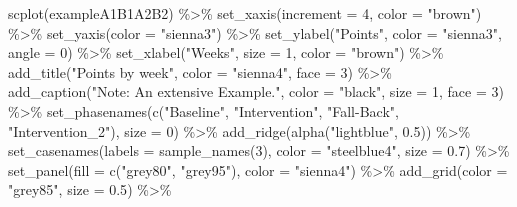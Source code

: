 \documentclass[
  letterpaper,
  DIV=11,
  numbers=noendperiod]{scrreprt}
\newenvironment{Shaded}{\begin{snugshade}}{\end{snugshade}}
\newcommand{\AttributeTok}[1]{\textcolor[rgb]{0.40,0.45,0.13}{#1}}
\newcommand{\DecValTok}[1]{\textcolor[rgb]{0.68,0.00,0.00}{#1}}
\newcommand{\FloatTok}[1]{\textcolor[rgb]{0.68,0.00,0.00}{#1}}
\newcommand{\FunctionTok}[1]{\textcolor[rgb]{0.28,0.35,0.67}{#1}}
\newcommand{\NormalTok}[1]{\textcolor[rgb]{0.00,0.23,0.31}{#1}}
\newcommand{\SpecialCharTok}[1]{\textcolor[rgb]{0.37,0.37,0.37}{#1}}
\newcommand{\StringTok}[1]{\textcolor[rgb]{0.13,0.47,0.30}{#1}}
\begin{document}
\begin{Shaded}
\begin{Highlighting}[]
\FunctionTok{scplot}\NormalTok{(exampleA1B1A2B2) }\SpecialCharTok{\%\textgreater{}\%} 
  \FunctionTok{set\_xaxis}\NormalTok{(}\AttributeTok{increment =} \DecValTok{4}\NormalTok{, }\AttributeTok{color =} \StringTok{"brown"}\NormalTok{) }\SpecialCharTok{\%\textgreater{}\%}
  \FunctionTok{set\_yaxis}\NormalTok{(}\AttributeTok{color =} \StringTok{"sienna3"}\NormalTok{) }\SpecialCharTok{\%\textgreater{}\%}
  \FunctionTok{set\_ylabel}\NormalTok{(}\StringTok{"Points"}\NormalTok{, }\AttributeTok{color =} \StringTok{"sienna3"}\NormalTok{, }\AttributeTok{angle =} \DecValTok{0}\NormalTok{) }\SpecialCharTok{\%\textgreater{}\%}
  \FunctionTok{set\_xlabel}\NormalTok{(}\StringTok{"Weeks"}\NormalTok{, }\AttributeTok{size =} \DecValTok{1}\NormalTok{, }\AttributeTok{color =} \StringTok{"brown"}\NormalTok{) }\SpecialCharTok{\%\textgreater{}\%}
  \FunctionTok{add\_title}\NormalTok{(}\StringTok{"Points by week"}\NormalTok{, }\AttributeTok{color =} \StringTok{"sienna4"}\NormalTok{, }\AttributeTok{face =} \DecValTok{3}\NormalTok{) }\SpecialCharTok{\%\textgreater{}\%}
  \FunctionTok{add\_caption}\NormalTok{(}\StringTok{"Note: An extensive Example."}\NormalTok{,}
              \AttributeTok{color =} \StringTok{"black"}\NormalTok{, }\AttributeTok{size =} \DecValTok{1}\NormalTok{, }\AttributeTok{face =} \DecValTok{3}\NormalTok{) }\SpecialCharTok{\%\textgreater{}\%}
  \FunctionTok{set\_phasenames}\NormalTok{(}\FunctionTok{c}\NormalTok{(}\StringTok{"Baseline"}\NormalTok{, }\StringTok{"Intervention"}\NormalTok{, }\StringTok{"Fall{-}Back"}\NormalTok{, }\StringTok{"Intervention\_2"}\NormalTok{), }
                 \AttributeTok{size =} \DecValTok{0}\NormalTok{) }\SpecialCharTok{\%\textgreater{}\%}
  \FunctionTok{add\_ridge}\NormalTok{(}\FunctionTok{alpha}\NormalTok{(}\StringTok{"lightblue"}\NormalTok{, }\FloatTok{0.5}\NormalTok{)) }\SpecialCharTok{\%\textgreater{}\%}
  \FunctionTok{set\_casenames}\NormalTok{(}\AttributeTok{labels =} \FunctionTok{sample\_names}\NormalTok{(}\DecValTok{3}\NormalTok{), }\AttributeTok{color =} \StringTok{"steelblue4"}\NormalTok{, }\AttributeTok{size =} \FloatTok{0.7}\NormalTok{) }\SpecialCharTok{\%\textgreater{}\%}
  \FunctionTok{set\_panel}\NormalTok{(}\AttributeTok{fill =} \FunctionTok{c}\NormalTok{(}\StringTok{"grey80"}\NormalTok{, }\StringTok{"grey95"}\NormalTok{), }\AttributeTok{color =} \StringTok{"sienna4"}\NormalTok{) }\SpecialCharTok{\%\textgreater{}\%}
  \FunctionTok{add\_grid}\NormalTok{(}\AttributeTok{color =} \StringTok{"grey85"}\NormalTok{, }\AttributeTok{size =} \FloatTok{0.5}\NormalTok{) }\SpecialCharTok{\%\textgreater{}\%}

\end{Highlighting}
\end{Shaded}
\end{document}
